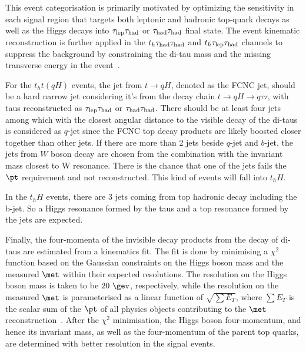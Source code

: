 This event categorisation is primarily motivated by optimizing the sensitivity in each signal region that targets both leptonic and hadronic top-quark
decays as well as the Higgs decays into $\tau_{\mathrm{lep}} \tau_{\mathrm{had}}$ or $\tau_{\mathrm{had}} \tau_{\mathrm{had}}$ final state.   
The event kinematic reconstruction is further applied in the $t_h\tau_{\mathrm{had}} \tau_{\mathrm{had}}$ and $t_h\tau_{\mathrm{lep}} \tau_{\mathrm{had}}$ channels to suppress the background by constraining the
di-tau mass and the missing transverse energy in the event~\cite{Chen:2015nta}. 

For the $t_ht(qH)$ events, the jet from $t\to qH$, denoted as the FCNC jet, should be a hard narrow jet considering it's from the
decay chain $t\to qH\to q\tau\tau$, with taus reconstructed as $\tau_{\mathrm{lep}} \tau_{\mathrm{had}}$ or $\tau_{\mathrm{had}} \tau_{\mathrm{had}}$.
There should be at least four jets among which with the closest angular distance to the visible decay of the di-taus
is considered as $q$-jet since the FCNC top decay products are likely boosted closer together than other jets. 
If there are more than 2 jets beside $q$-jet and $b$-jet, the jets from $W$ boson decay are chosen from the combination
with the invariant mass closest to W resonance. There is the chance that one of the jets fails the $\pt$ requirement and not reconstructed. This kind of events will fall
into $t_hH$.

In the $t_hH$ events, there are 3 jets coming from top hadronic decay including the b-jet. So a Higgs resonance formed by the taus and a top resonance formed by
the jets are expected.

Finally, the four-momenta of the invisible decay products from the decay of di-taus 
are estimated from a kinematics fit. The fit is done by minimising a $\chi^2$ function based on the Gaussian constraints on the Higgs boson mass and the
measured $\met$ within their expected resolutions. The resolution on the Higgs boson mass is taken to be $20~\gev$, respectively, while the resolution on the measured $\met$ is parameterised as a linear function of 
$\sqrt{\sum E_T}$, where $\sum E_T$ is the scalar sum of the $\pt$ of all physics objects contributing to the $\met$ reconstruction~\cite{Aaboud:2018tkc}.
After the $\chi^2$ minimisation, the Higgs boson four-momentum, and hence its invariant mass, as well as the 
four-momentum of the parent top quarks, are determined with better resolution in the signal events. 

